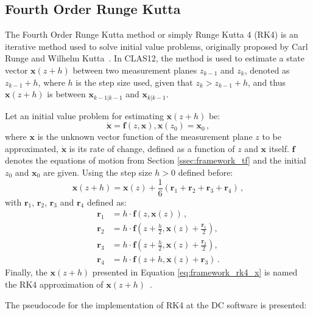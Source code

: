 \subsection{Fourth Order Runge Kutta} \label{ssec:framework_rk4} 
The Fourth Order Runge Kutta method or simply Runge Kutta 4 (RK4) is an iterative method used to solve initial value problems, originally proposed by Carl Runge and Wilhelm Kutta~\cite{runge1895numerische}.
In CLAS12, the method is used to estimate a state vector $\mathbf{x}(z+h)$ between two measurement planes $z_{k-1}$ and $z_k$, denoted as $z_{k-1} + h$, where $h$ is the step size used, given that $z_k > z_{k-1} + h$, and thus $\mathbf{x}(z+h)$ is between $\mathbf{x}_{k-1|k-1}$ and $\mathbf{x}_{k|k-1}$.

Let an initial value problem for estimating $\mathbf{x}(z+h)$ be:
    \begin{equation*}
        \mathbf{\dot{x}} = \mathbf{f}(z,\mathbf{x}), \mathbf{x}(z_0) = \mathbf{x}_0\,,
    \end{equation*}
where $\mathbf{x}$ is the unknown vector function of the measurement plane $z$ to be approximated, $\mathbf{\dot{x}}$ is its rate of change, defined as a function of $z$ and $\mathbf{x}$ itself.
$\mathbf{f}$ denotes the equations of motion from Section \ref{ssec:framework_tf} and the initial $z_0$ and $\mathbf{x}_0$ are given.
Using the step size $h > 0$ defined before:
    \begin{equation}
        \mathbf{x}(z+h) = \mathbf{x}(z) + \frac{1}{6}(\mathbf{r}_1 + \mathbf{r}_2 + \mathbf{r}_3 + \mathbf{r}_4)\,,\label{eq:framework_rk4_x}
    \end{equation}
with $\mathbf{r}_1$, $\mathbf{r}_2$, $\mathbf{r}_3$ and $\mathbf{r}_4$ defined as:
    \begin{align*}
        \mathbf{r}_1 &= h\cdot\mathbf{f}(z, \mathbf{x}(z))\,,\\
        \mathbf{r}_2 &= h\cdot\mathbf{f}\left(z + \frac{h}{2}, \mathbf{x}(z) + \frac{\mathbf{r}_1}{2}\right),\\
        \mathbf{r}_3 &= h\cdot\mathbf{f}\left(z + \frac{h}{2}, \mathbf{x}(z) + \frac{\mathbf{r}_2}{2}\right),\\
        \mathbf{r}_4 &= h\cdot\mathbf{f}(z + h, \mathbf{x}(z) + \mathbf{r}_3)\,.
    \end{align*}
Finally, the $\mathbf{x}(z+h)$ presented in Equation \eqref{eq:framework_rk4_x} is named the RK4 approximation of $\mathbf{x}(z+h)$~\cite{sauer2012numerical}.

The pseudocode for the implementation of RK4 at the DC software is presented:


